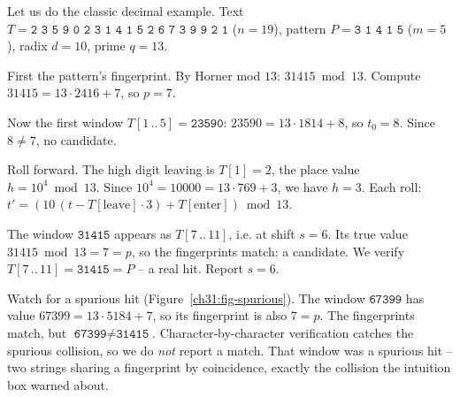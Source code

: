 \begin{labbox}
Let us do the classic decimal example. Text
$T = \texttt{2 3 5 9 0 2 3 1 4 1 5 2 6 7 3 9 9 2 1}$ ($n=19$),
pattern $P = \texttt{3 1 4 1 5}$ ($m=5$), radix $d=10$, prime $q=13$.

First the pattern's fingerprint. By Horner mod $13$:
$31415 \bmod 13$. Compute $31415 = 13 \cdot 2416 + 7$, so $p = 7$.

Now the first window $T[1\,..\,5] = \texttt{23590}$:
$23590 = 13\cdot 1814 + 8$, so $t_0 = 8$. Since $8 \ne 7$, no candidate.

Roll forward. The high digit leaving is $T[1]=2$, the place value
$h = 10^4 \bmod 13$. Since $10^4 = 10000 = 13\cdot 769 + 3$, we have $h = 3$.
Each roll: $t' = (10\,(t - T[\text{leave}]\cdot 3) + T[\text{enter}]) \bmod 13$.

The window $\texttt{31415}$ appears as $T[7\,..\,11]$, i.e. at shift $s=6$. Its
true value $31415 \bmod 13 = 7 = p$, so the fingerprints match: a candidate. We
verify $T[7\,..\,11]=\texttt{31415}=P$ -- a real hit. Report $s=6$.

Watch for a spurious hit (Figure~\ref{ch31:fig-spurious}). The window $\texttt{67399}$ has value
$67399 = 13\cdot 5184 + 7$, so its fingerprint is also $7 = p$. The fingerprints
match, but $\texttt{67399} \ne \texttt{31415}$. Character-by-character
verification catches the spurious collision, so we do \emph{not} report a match. That window was a spurious hit
-- two strings sharing a fingerprint by coincidence, exactly the collision the
intuition box warned about.

\begin{figure}[H]
\centering
{}
\end{figure}
\end{labbox}
